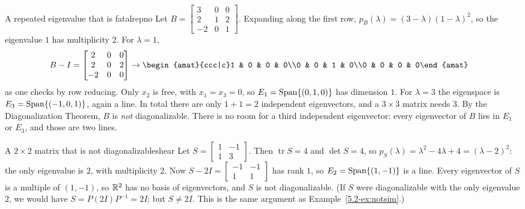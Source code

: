 \documentclass[11pt]{article}
\begin{document}
\begin{exmp}{A repeated eigenvalue that is fatal}{repno}
Let $B=\begin{bmatrix}3&0&0\\2&1&2\\-2&0&1\end{bmatrix}$. Expanding along the first row, $p_B(\lambda)=(3-\lambda)(1-\lambda)^2$, so the eigenvalue $1$ has multiplicity $2$. For $\lambda=1$,
\begin{align*}
B-I=\begin{bmatrix}2&0&0\\2&0&2\\-2&0&0\end{bmatrix}
&\rightarrow\begin{amat}{ccc|c}1 & 0 & 0 & 0\\0 & 0 & 1 & 0\\0 & 0 & 0 & 0\end{amat}
\end{align*}
as one checks by row reducing. Only $x_2$ is free, with $x_1=x_3=0$, so $E_1=\operatorname{Span}\{(0,1,0)\}$ has dimension $1$. For $\lambda=3$ the eigenspace is $E_3=\operatorname{Span}\{(-1,0,1)\}$, again a line. In total there are only $1+1=2$ independent eigenvectors, and a $3\times3$ matrix needs $3$. By the Diagonalization Theorem, $B$ is \emph{not} diagonalizable. There is no room for a third independent eigenvector: every eigenvector of $B$ lies in $E_1$ or $E_3$, and those are two lines.
\end{exmp}

\begin{exmp}{A $2\times2$ matrix that is not diagonalizable}{shear}
Let $S=\begin{bmatrix}1&-1\\1&3\end{bmatrix}$. Then $\operatorname{tr}S=4$ and $\det S=4$, so $p_S(\lambda)=\lambda^2-4\lambda+4=(\lambda-2)^2$: the only eigenvalue is $2$, with multiplicity $2$. Now $S-2I=\begin{bmatrix}-1&-1\\1&1\end{bmatrix}$ has rank $1$, so $E_2=\operatorname{Span}\{(1,-1)\}$ is a line. Every eigenvector of $S$ is a multiple of $(1,-1)$, so $\mathbb{R}^2$ has no basis of eigenvectors, and $S$ is not diagonalizable. (If $S$ were diagonalizable with the only eigenvalue $2$, we would have $S=P(2I)P^{-1}=2I$; but $S\neq2I$. This is the same argument as Example~\ref{5.2-ex:notsim}.)
\end{exmp}
\end{document}
